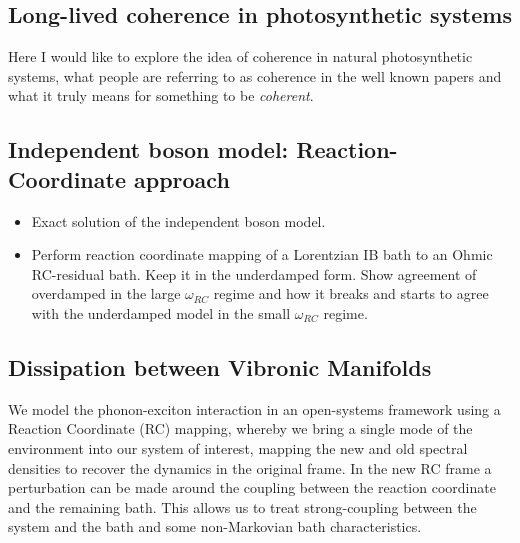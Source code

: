 \documentclass[]{article}
\begin{document}
\subsection{Long-lived coherence in photosynthetic systems}
Here I would like to explore the idea of coherence in natural photosynthetic systems, what people are referring to as coherence in the well known papers and what it truly means for something to be \textit{coherent}.

\subsection{Independent boson model: Reaction-Coordinate approach}
\begin{itemize}
	\item Exact solution of the independent boson model.
	\item Perform reaction coordinate mapping of a Lorentzian IB bath to an Ohmic RC-residual bath. Keep it in the underdamped form. Show agreement of overdamped in the large $\omega_{RC}$ regime and how it breaks and starts to agree with the underdamped model in the small $\omega_{RC}$ regime.
\end{itemize}
\subsection{Dissipation between Vibronic Manifolds}
We model the phonon-exciton interaction in an open-systems framework using a Reaction Coordinate (RC) mapping, whereby we bring a single mode of the environment into our system of interest, mapping the new and old spectral densities to recover the dynamics in the original frame. In the new RC frame  a perturbation can be made around the coupling between the reaction coordinate and the remaining bath. This allows us to treat strong-coupling between the system and the bath and some non-Markovian bath characteristics.
\end{document}
